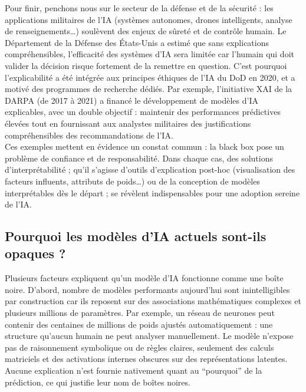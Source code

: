 \documentclass{article}
\begin{document}
Pour finir, penchons nous sur le secteur de la défense et de la sécurité : les applications militaires de l’IA (systèmes autonomes, drones intelligents, analyse de renseignements…) soulèvent des enjeux de sûreté et de contrôle humain. Le Département de la Défense des États-Unis a estimé que sans explications compréhensibles, l’efficacité des systèmes d’IA sera limitée car l’humain qui doit valider la décision risque fortement de la remettre en question. C’est pourquoi l’explicabilité a été intégrée aux principes éthiques de l’IA du DoD en 2020, et a motivé des programmes de recherche dédiés. Par exemple, l’initiative XAI de la DARPA (de 2017 à 2021) a financé le développement de modèles d’IA explicables, avec un double objectif : maintenir des performances prédictives élevées tout en fournissant aux analystes militaires des justifications compréhensibles des recommandations de l’IA.\\

Ces exemples mettent en évidence un constat commun : la black box pose un problème de confiance et de responsabilité. Dans chaque cas, des solutions d’interprétabilité ; qu’il s’agisse d’outils d’explication post-hoc (visualisation des facteurs influents, attributs de poids…) ou de la conception de modèles interprétables dès le départ ; se révèlent indispensables pour une adoption sereine de l’IA.

\subsection{Pourquoi les modèles d’IA actuels sont-ils opaques ?}

\quad Plusieurs facteurs expliquent qu’un modèle d’IA fonctionne comme une boîte noire. D’abord, nombre de modèles performants aujourd’hui sont inintelligibles par construction car ils reposent sur des associations mathématiques complexes et plusieurs millions de paramètres. Par exemple, un réseau de neurones peut contenir des centaines de millions de poids ajustés automatiquement : une structure qu’aucun humain ne peut analyser manuellement. Le modèle n’expose pas de raisonnement symbolique ou de règles claires, seulement des calculs matriciels et des activations internes obscures sur des représentations latentes. Aucune explication n’est fournie nativement quant au “pourquoi” de la prédiction, ce qui justifie leur nom de boîtes noires.\\
\end{document}
